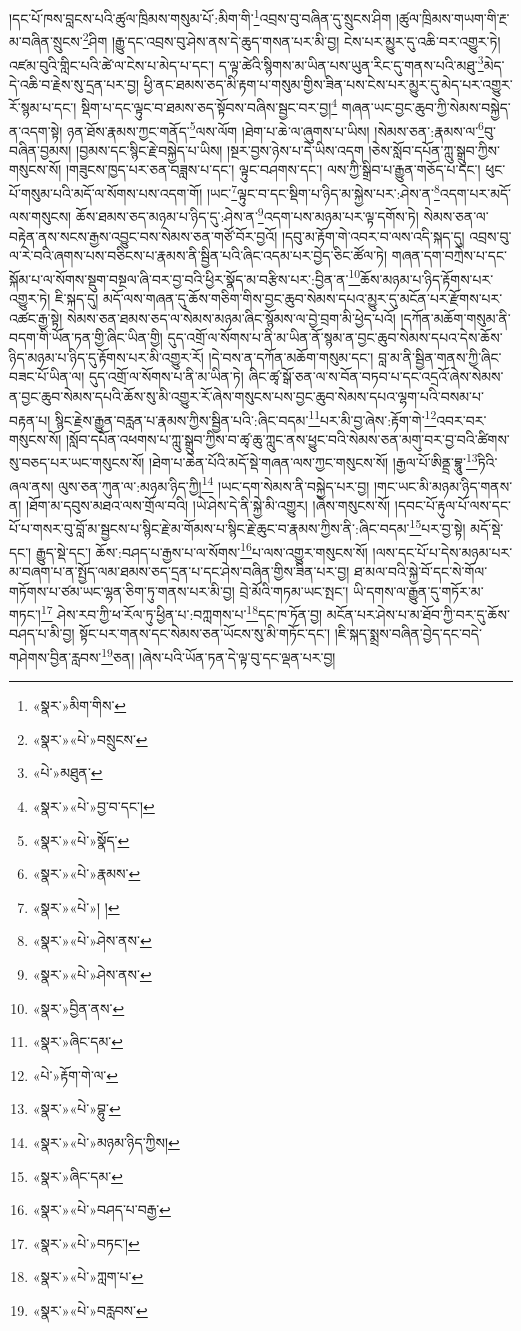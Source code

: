 །དང་པོ་ཁས་བླངས་པའི་ཚུལ་ཁྲིམས་གསུམ་པོ་:མིག་གི་\footnote{«སྣར་»མིག་གིས་}འབྲས་བུ་བཞིན་དུ་སྲུངས་ཤིག །ཚུལ་ཁྲིམས་གཡག་གི་རྔ་མ་བཞིན་སྲུངས་\footnote{«སྣར་»«པེ་»བསྲུངས་}ཤིག །རྒྱུ་དང་འབྲས་བུ་ཤེས་ནས་དེ་ཆུད་གསན་པར་མི་བྱ། ངེས་པར་མྱུར་དུ་འཆི་བར་འགྱུར་ཏེ། འཛམ་བུའི་གླིང་པའི་ཚེ་ལ་ངེས་པ་མེད་པ་དང་། ད་ལྟ་ཚེའི་སྙིགས་མ་ཡིན་པས་ཡུན་རིང་དུ་གནས་པའི་མཐུ་\footnote{«པེ་»མཐུན་}མེད་དེ་འཆི་བ་རྗེས་སུ་དྲན་པར་བྱ། ཕྱི་ནང་ཐམས་ཅད་མི་རྟག་པ་གསུམ་གྱིས་ཟིན་པས་ངེས་པར་མྱུར་དུ་མེད་པར་འགྱུར་རོ་སྙམ་པ་དང་། སྡིག་པ་དང་ལྟུང་བ་ཐམས་ཅད་སྟོབས་བཞིས་སྦྱང་བར་བྱ།\footnote{«སྣར་»«པེ་»བྱ་བ་དང་།} གཞན་ཡང་བྱང་ཆུབ་ཀྱི་སེམས་བསྐྱེད་ན་འདག་སྟེ། ཉན་ཐོས་རྣམས་ཀྱང་གནོད་\footnote{«སྣར་»«པེ་»སྣོད་}ལས་ལོག །ཐེག་པ་ཆེ་ལ་ཞུགས་པ་ཡིས། །སེམས་ཅན་:རྣམས་ལ་\footnote{«སྣར་»«པེ་»རྣམས་}བུ་བཞིན་བྱམས། །བྱམས་དང་སྙིང་རྗེ་བསྐྱེད་པ་ཡིས། །སྔར་བྱས་ཉེས་པ་དེ་ཡིས་འདག །ཅེས་སློབ་དཔོན་ཀླུ་སྒྲུབ་ཀྱིས་གསུངས་སོ། །གཟུངས་ཁྱད་པར་ཅན་བཟླས་པ་དང་། ལྟུང་བཤགས་དང་། ལས་ཀྱི་སྒྲིབ་པ་རྒྱུན་གཅོད་པ་དང་། ཕུང་པོ་གསུམ་པའི་མདོ་ལ་སོགས་པས་འདག་གོ། །ཡང་\footnote{«སྣར་»«པེ་»། །}ལྟུང་བ་དང་སྡིག་པ་ཉིད་མ་སྐྱེས་པར་:ཤེས་ན་\footnote{«སྣར་»«པེ་»ཤེས་ནས་}འདག་པར་མདོ་ལས་གསུངས། ཆོས་ཐམས་ཅད་མཉམ་པ་ཉིད་དུ་:ཤེས་ན་\footnote{«སྣར་»«པེ་»ཤེས་ནས་}འདག་པས་མཉམ་པར་ལྟ་དགོས་ཏེ། སེམས་ཅན་ལ་བརྟེན་ནས་སངས་རྒྱས་འབྱུང་བས་སེམས་ཅན་གཙོ་བོར་བྱའོ། །དབུ་མ་རྟོག་གེ་འབར་བ་ལས་འདི་སྐད་དུ། འབྲས་བུ་ལ་རེ་བའི་ཞགས་པས་བཅིངས་པ་རྣམས་ནི་སྦྱིན་པའི་ཞིང་འདམ་པར་བྱེད་ཅིང་ཚོལ་ཏེ། གཞན་དག་བཀྲེས་པ་དང་སྐོམ་པ་ལ་སོགས་སྡུག་བསྔལ་ཞི་བར་བྱ་བའི་ཕྱིར་སྣོད་མ་བརྩིས་པར་:བྱིན་ན་\footnote{«སྣར་»བྱིན་ནས་}ཆོས་མཉམ་པ་ཉིད་རྟོགས་པར་འགྱུར་ཏེ། ཇི་སྐད་དུ། མདོ་ལས་གཞན་དུ་ཆོས་གཅིག་གིས་བྱང་ཆུབ་སེམས་དཔའ་མྱུར་དུ་མངོན་པར་རྫོགས་པར་འཚང་རྒྱ་སྟེ། སེམས་ཅན་ཐམས་ཅད་ལ་སེམས་མཉམ་ཞིང་སྙོམས་ལ་བྱེ་བྲག་མི་ཕྱེད་པའོ། །དཀོན་མཆོག་གསུམ་ནི་བདག་གི་ཡོན་ཏན་གྱི་ཞིང་ཡིན་གྱི། དུད་འགྲོ་ལ་སོགས་པ་ནི་མ་ཡིན་ནོ་སྙམ་ན་བྱང་ཆུབ་སེམས་དཔའ་དེས་ཆོས་ཉིད་མཉམ་པ་ཉིད་དུ་རྟོགས་པར་མི་འགྱུར་རོ། །དེ་བས་ན་དཀོན་མཆོག་གསུམ་དང་། བླ་མ་ནི་སྦྱིན་གནས་ཀྱི་ཞིང་བཟང་པོ་ཡིན་ལ། དུད་འགྲོ་ལ་སོགས་པ་ནི་མ་ཡིན་ཏེ། ཞིང་ཚྭ་སྒོ་ཅན་ལ་ས་བོན་བཏབ་པ་དང་འདྲའོ་ཞེས་སེམས་ན་བྱང་ཆུབ་སེམས་དཔའི་ཆོས་སུ་མི་འགྱུར་རོ་ཞེས་གསུངས་པས་བྱང་ཆུབ་སེམས་དཔའ་ལྷག་པའི་བསམ་པ་བརྟན་པ། སྙིང་རྗེས་རྒྱུན་བརླན་པ་རྣམས་ཀྱིས་སྦྱིན་པའི་:ཞིང་བདམ་\footnote{«སྣར་»ཞིང་དམ་}པར་མི་བྱ་ཞེས་:རྟོག་གེ་\footnote{«པེ་»རྟོག་གེ་ལ་}འབར་བར་གསུངས་སོ། །སློབ་དཔོན་འཕགས་པ་ཀླུ་སྒྲུབ་ཀྱིས་བ་ཚྭ་ཆུ་ཀླུང་ནས་ཕྱུང་བའི་སེམས་ཅན་མགུ་བར་བྱ་བའི་ཚིགས་སུ་བཅད་པར་ཡང་གསུངས་སོ། །ཐེག་པ་ཆེན་པོའི་མདོ་སྡེ་གཞན་ལས་ཀྱང་གསུངས་སོ། །རྒྱལ་པོ་ཨིནྡྲ་བྷཱུ་\footnote{«སྣར་»«པེ་»བྷུ་}ཏིའི་ཞལ་ནས། ལུས་ཅན་ཀུན་ལ་:མཉམ་ཉིད་ཀྱི།\footnote{«སྣར་»«པེ་»མཉམ་ཉིད་ཀྱིས།} །ཡང་དག་སེམས་ནི་བསྐྱེད་པར་བྱ། །གང་ཡང་མི་མཉམ་ཉིད་གནས་ན། །ཐོག་མ་དབུས་མཐའ་ལས་གྲོལ་བའི། །ཡེ་ཤེས་དེ་ནི་སྐྱེ་མི་འགྱུར། །ཞེས་གསུངས་སོ། །དབང་པོ་རྟུལ་པོ་ལས་དང་པོ་པ་གསར་བུ་བློ་མ་སྦྱངས་པ་སྙིང་རྗེ་མ་གོམས་པ་སྙིང་རྗེ་ཆུང་བ་རྣམས་ཀྱིས་ནི་:ཞིང་བདམ་\footnote{«སྣར་»ཞིང་དམ་}པར་བྱ་སྟེ། མདོ་སྡེ་དང་། རྒྱུད་སྡེ་དང་། ཆོས་:བཤད་པ་རྒྱས་པ་ལ་སོགས་\footnote{«སྣར་»«པེ་»བཤད་པ་བརྒྱ་}པ་ལས་འགྱུར་གསུངས་སོ། །ལས་དང་པོ་པ་དེས་མཉམ་པར་མ་བཞག་པ་ན་སྤྱོད་ལམ་ཐམས་ཅད་དྲན་པ་དང་ཤེས་བཞིན་གྱིས་ཟིན་པར་བྱ། ཐ་མལ་བའི་སྐྱེ་བོ་དང་སེ་གོལ་གཏོགས་པ་ཙམ་ཡང་ལྷན་ཅིག་ཏུ་གནས་པར་མི་བྱ། བྲེ་མོའི་གཏམ་ཡང་སྤང་། ཡི་དགས་ལ་རྒྱུན་དུ་གཏོར་མ་གཏང་།\footnote{«སྣར་»«པེ་»བཏང་།} ཤེས་རབ་ཀྱི་ཕ་རོལ་ཏུ་ཕྱིན་པ་:བཀླགས་པ་\footnote{«སྣར་»«པེ་»ཀླག་པ་}དང་ཁ་ཏོན་བྱ། མངོན་པར་ཤེས་པ་མ་ཐོབ་ཀྱི་བར་དུ་ཆོས་བཤད་པ་མི་བྱ། སྟོང་པར་གནས་དང་སེམས་ཅན་ཡོངས་སུ་མི་གཏོང་དང་། །ཇི་སྐད་སྨྲས་བཞིན་བྱེད་དང་བདེ་གཤེགས་བྱིན་རླབས་\footnote{«སྣར་»«པེ་»བརླབས་}ཅན། །ཞེས་པའི་ཡོན་ཏན་དེ་ལྟ་བུ་དང་ལྡན་པར་བྱ། 
